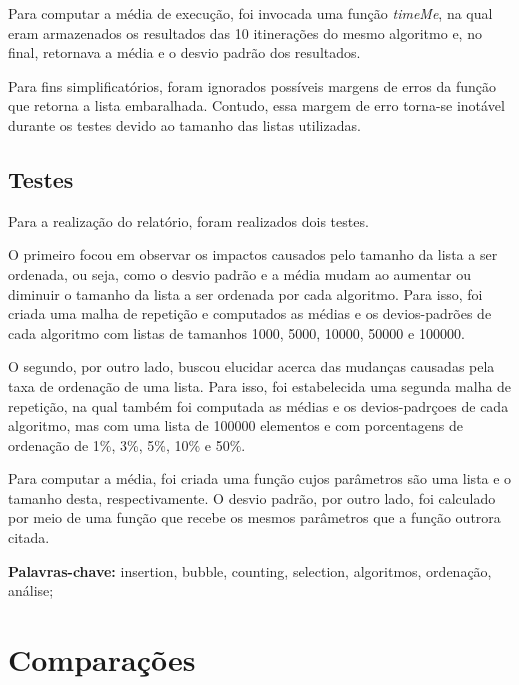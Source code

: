 \documentclass[10pt,a4paper]{article}
\begin{document}
Para computar a média de execução, foi invocada uma função \textit{timeMe}, na qual eram armazenados os resultados das 10 itinerações do mesmo algoritmo e, no final, retornava a média e o desvio padrão dos resultados.

Para fins simplificatórios, foram ignorados possíveis margens de erros da função que retorna a lista embaralhada. Contudo, essa margem de erro torna-se inotável durante os testes devido ao tamanho das listas utilizadas.
\subsection{Testes}
    Para a realização do relatório, foram realizados dois testes. 
    
    O primeiro focou em observar os impactos causados pelo tamanho da lista a ser ordenada, ou seja, como o desvio padrão e a média mudam ao aumentar ou diminuir o tamanho da lista a ser ordenada por cada algoritmo. 
    Para isso, foi criada uma malha de repetição e computados as médias e os devios-padrões de cada algoritmo com listas de tamanhos 1000, 5000, 10000, 50000 e 100000.
    
    O segundo, por outro lado, buscou elucidar acerca das mudanças causadas pela taxa de ordenação de uma lista.
    Para isso, foi estabelecida uma segunda malha de repetição, na qual também foi computada as médias e os devios-padrçoes de cada algoritmo, mas com uma lista de 100000 elementos e com porcentagens de ordenação de 1\%, 3\%, 5\%, 10\% e 50\%.
    

    Para computar a média, foi criada uma função cujos parâmetros são uma lista e o tamanho desta, respectivamente. O desvio padrão, por outro lado, foi calculado por meio de uma função que recebe os mesmos parâmetros que a função outrora citada.
    

\noindent\textbf{Palavras-chave:} insertion, bubble, counting, selection, algoritmos, ordenação, análise;

\newpage
\tableofcontents





\section{Comparações}
\end{document}
